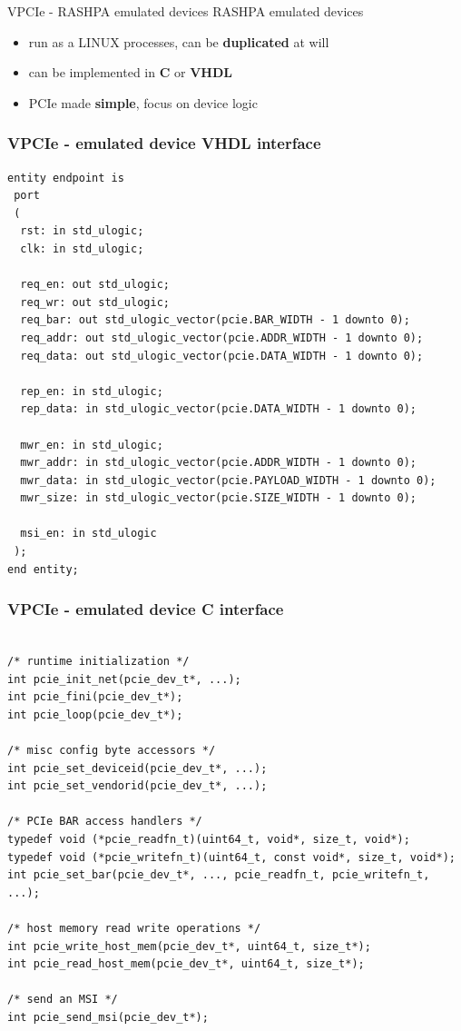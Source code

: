 \documentclass{beamer}
\begin{document}
\begin{frame}{VPCIe - RASHPA emulated devices}
  RASHPA emulated devices
  \begin{itemize}
  \item run as a LINUX processes, can be \textbf{duplicated} at will
  \item can be implemented in \textbf{C} or \textbf{VHDL}
  \item PCIe made \textbf{simple}, focus on device logic
  \end{itemize}
\end{frame}

\begin{frame}[containsverbatim]
 \frametitle{VPCIe - emulated device VHDL interface}
 \begin{tiny}
 \lstset{language=VHDL}
 \begin{lstlisting}[frame=tb]
entity endpoint is
 port
 (
  rst: in std_ulogic;
  clk: in std_ulogic;

  req_en: out std_ulogic;
  req_wr: out std_ulogic;
  req_bar: out std_ulogic_vector(pcie.BAR_WIDTH - 1 downto 0);
  req_addr: out std_ulogic_vector(pcie.ADDR_WIDTH - 1 downto 0);
  req_data: out std_ulogic_vector(pcie.DATA_WIDTH - 1 downto 0);

  rep_en: in std_ulogic;
  rep_data: in std_ulogic_vector(pcie.DATA_WIDTH - 1 downto 0);

  mwr_en: in std_ulogic;
  mwr_addr: in std_ulogic_vector(pcie.ADDR_WIDTH - 1 downto 0);
  mwr_data: in std_ulogic_vector(pcie.PAYLOAD_WIDTH - 1 downto 0);
  mwr_size: in std_ulogic_vector(pcie.SIZE_WIDTH - 1 downto 0);

  msi_en: in std_ulogic
 );
end entity;
 \end{lstlisting}
 \end{tiny}
\end{frame}

\begin{frame}[containsverbatim]
 \frametitle{VPCIe - emulated device C interface}
 \begin{tiny}
 \lstset{language=C}
 \begin{lstlisting}[frame=tb]

/* runtime initialization */
int pcie_init_net(pcie_dev_t*, ...);
int pcie_fini(pcie_dev_t*);
int pcie_loop(pcie_dev_t*);

/* misc config byte accessors */
int pcie_set_deviceid(pcie_dev_t*, ...);
int pcie_set_vendorid(pcie_dev_t*, ...);

/* PCIe BAR access handlers */
typedef void (*pcie_readfn_t)(uint64_t, void*, size_t, void*);
typedef void (*pcie_writefn_t)(uint64_t, const void*, size_t, void*);
int pcie_set_bar(pcie_dev_t*, ..., pcie_readfn_t, pcie_writefn_t, ...);

/* host memory read write operations */
int pcie_write_host_mem(pcie_dev_t*, uint64_t, size_t*);
int pcie_read_host_mem(pcie_dev_t*, uint64_t, size_t*);

/* send an MSI */
int pcie_send_msi(pcie_dev_t*);
 \end{lstlisting}
 \end{tiny}
\end{frame}
\end{document}
